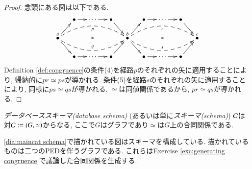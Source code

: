 \begin{proof}


念頭にある図は以下である. $$\xymatrix@=13pt{&\bullet\ar[r]&\cdots\ar[r]&\bullet\ar[dr]&&\bullet\ar[r]&\cdots\ar[r]&\bullet\ar[dr]\\\LMO{a}\ar@{}[rrrr]|{\simeq}\ar[ur]\ar[dr]\ar@{-->}@/^1.5pc/[rrrr]_p\ar@{-->}@/_1.5pc/[rrrr]^q&&&&\LMO{b}\ar@{}[rrrr]|{\simeq}\ar[ur]\ar[dr]\ar@{-->}@/^1.5pc/[rrrr]_r\ar@{-->}@/_1.5pc/[rrrr]^s&&&&\LMO{c}\\&\bullet\ar[r]&\cdots\ar[r]&\bullet\ar[ur]&&\bullet\ar[r]&\cdots\ar[r]&\bullet\ar[ur]}$$ Definition \ref{def:congruence}の条件(4)を経路$p$のそれぞれの矢に適用することにより, 帰納的に$pr\simeq ps$が導かれる. 条件(5)を経路$s$のそれぞれの矢に適用することにより, 同様に$ps\simeq qs$が導かれる. $\simeq$は同値関係であるから, $pr\simeq qs$が導かれる.

\end{proof}

\begin{definition}\label{def:schema}


\emph{データベーススキーマ(database schema)} (あるいは単に\emph{スキーマ(schema)}) $\mathcal{C}$は対$\mathcal{C}:=(G,\simeq)$からなる, ここで$G$はグラフであり$\simeq$は$G$上の合同関係である.

\end{definition}

\begin{example}


\eqref{dia:maincat schema}で描かれている図はスキーマを構成している. 描かれているものは二つのPEDを伴うグラフである. これらはExercise \ref{exc:generating congruence}で議論した合同関係を生成する.

\end{example}

